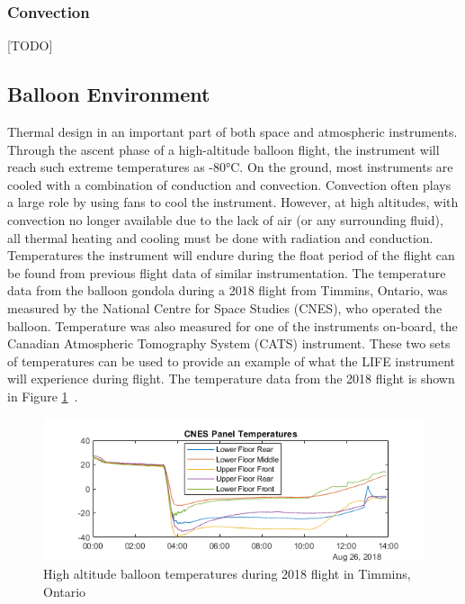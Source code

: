 \subsubsection{Convection}
[TODO]

\subsection{Balloon Environment}
Thermal design in an important part of both space and atmospheric instruments. Through the ascent phase of a high-altitude balloon flight, the instrument will reach such extreme temperatures as -80°C. On the ground, most instruments are cooled with a combination of conduction and convection. Convection often plays a large role by using fans to cool the instrument. However, at high altitudes, with convection no longer available due to the lack of air (or any surrounding fluid), all thermal heating and cooling must be done with radiation and conduction. 
 Temperatures the instrument will endure during the float period of the flight can be found from previous flight data of similar instrumentation. The temperature data from the balloon gondola during a 2018 flight from Timmins, Ontario, was measured by the National Centre for Space Studies (CNES), who operated the balloon. Temperature was also measured for one of the instruments on-board, the Canadian Atmospheric Tomography System (CATS) instrument. These two sets of temperatures can be used to provide an example of what the LIFE instrument will experience during flight. The temperature data from the 2018 flight is shown in Figure \ref{fig:2018_timmins_temps}~\citep{CATS_report}. 
 
 \begin{figure}[h]
\centering
  \includegraphics{chap2_images/CNES_temps_CATS_2018.png}
  \caption{High altitude balloon temperatures during 2018 flight in Timmins, Ontario}
  \label{fig:2018_timmins_temps}
\end{figure}

